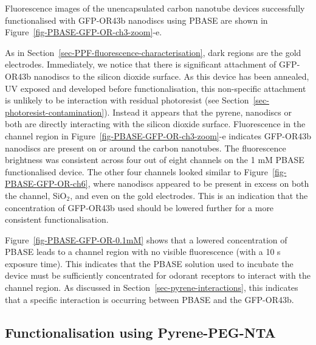 \documentclass[
  a4paper,
]{scrbook}
\begin{document}
Fluorescence images of the unencapsulated carbon nanotube devices
successfully functionalised with GFP-OR43b nanodiscs using PBASE are
shown in Figure~\ref{fig-PBASE-GFP-OR-ch3-zoom}-e.

As in Section~\ref{sec-PPF-fluorescence-characterisation}, dark regions
are the gold electrodes. Immediately, we notice that there is
significant attachment of GFP-OR43b nanodiscs to the silicon dioxide
surface. As this device has been annealed, UV exposed and developed
before functionalisation, this non-specific attachment is unlikely to be
interaction with residual photoresist (see
Section~\ref{sec-photoresist-contamination}). Instead it appears that
the pyrene, nanodiscs or both are directly interacting with the silicon
dioxide surface. Fluorescence in the channel region in
Figure~\ref{fig-PBASE-GFP-OR-ch3-zoom}-e indicates GFP-OR43b nanodiscs
are present on or around the carbon nanotubes. The fluorescence
brightness was consistent across four out of eight channels on the 1 mM
PBASE functionalised device. The other four channels looked similar to
Figure~\ref{fig-PBASE-GFP-OR-ch6}, where nanodiscs appeared to be
present in excess on both the channel, SiO\(_2\), and even on the gold
electrodes. This is an indication that the concentration of GFP-OR43b
used should be lowered further for a more consistent functionalisation.

Figure~\ref{fig-PBASE-GFP-OR-0.1mM} shows that a lowered concentration
of PBASE leads to a channel region with no visible fluorescence (with a
10 s exposure time). This indicates that the PBASE solution used to
incubate the device must be sufficiently concentrated for odorant
receptors to interact with the channel region. As discussed in
Section~\ref{sec-pyrene-interactions}, this indicates that a specific
interaction is occurring between PBASE and the GFP-OR43b.

\hypertarget{sec-NTA-functionalisation}{%
\subsection{Functionalisation using
Pyrene-PEG-NTA}\label{sec-NTA-functionalisation}}
\end{document}
